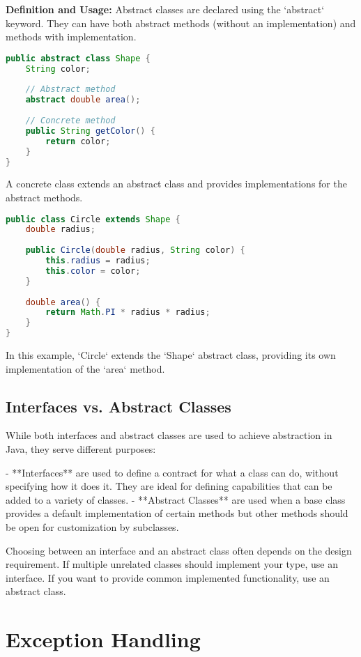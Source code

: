 \documentclass{article}
\begin{document}
\textbf{Definition and Usage:}
Abstract classes are declared using the `abstract` keyword. They can have both abstract methods (without an implementation) and methods with implementation.

\begin{lstlisting}[language=Java]
public abstract class Shape {
    String color;
    
    // Abstract method
    abstract double area();
    
    // Concrete method
    public String getColor() {
        return color;
    }
}
\end{lstlisting}

A concrete class extends an abstract class and provides implementations for the abstract methods.

\begin{lstlisting}[language=Java]
public class Circle extends Shape {
    double radius;
    
    public Circle(double radius, String color) {
        this.radius = radius;
        this.color = color;
    }
    
    double area() {
        return Math.PI * radius * radius;
    }
}
\end{lstlisting}

In this example, `Circle` extends the `Shape` abstract class, providing its own implementation of the `area` method.

\subsection{Interfaces vs. Abstract Classes}
While both interfaces and abstract classes are used to achieve abstraction in Java, they serve different purposes:

- **Interfaces** are used to define a contract for what a class can do, without specifying how it does it. They are ideal for defining capabilities that can be added to a variety of classes.
- **Abstract Classes** are used when a base class provides a default implementation of certain methods but other methods should be open for customization by subclasses.

Choosing between an interface and an abstract class often depends on the design requirement. If multiple unrelated classes should implement your type, use an interface. If you want to provide common implemented functionality, use an abstract class.


\newpage
\section{Exception Handling}
\end{document}
